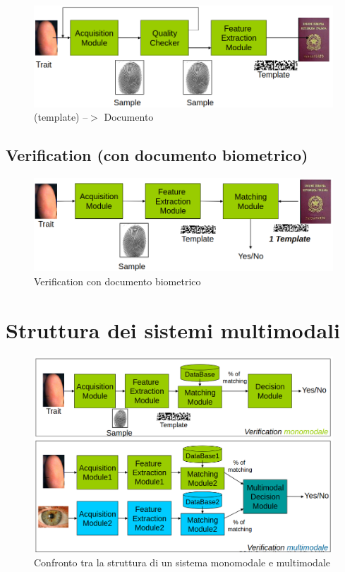 \documentclass{report}
\begin{document}
\begin{figure}[ht]
    \centering
    \includegraphics[width=0.95\linewidth]{images/enroll-doc.png}
    \caption{(template) --$>$ Documento}
    \label{fig:enroll-doc}
\end{figure}

\newpage
\subsection{Verification (con documento biometrico)}

\begin{figure}[ht]
    \centering
    \includegraphics[width=0.95\linewidth]{images/verification-doc.png}
    \caption{Verification con documento biometrico}
    \label{fig:enter-label}
\end{figure}

\section{Struttura dei sistemi multimodali}

\begin{figure}[ht]
    \centering
    \includegraphics[width=0.95\linewidth]{images/multimodali.png}
    \caption{Confronto tra la struttura di un sistema monomodale e multimodale}
    \label{fig:multimodal}
\end{figure}
\end{document}

